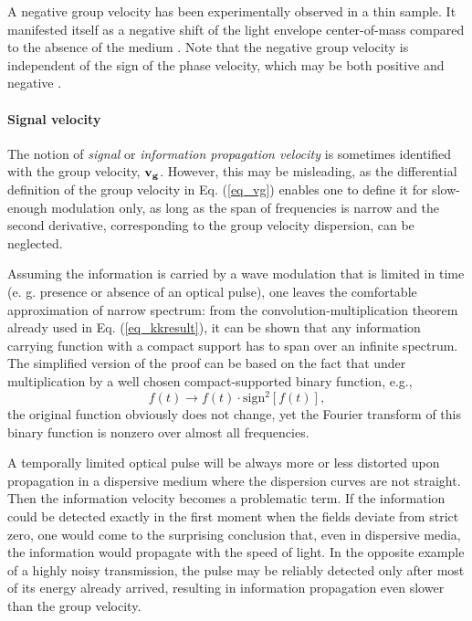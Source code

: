 A negative group velocity has been experimentally observed in a thin sample. It manifested itself as a negative shift of the light envelope center-of-mass compared to the absence of the medium \cite{dolling2006simultaneous}. Note that the negative group velocity is independent of the sign of the phase velocity, which may be both positive and negative \cite{mikki2009electromagnetic}.

\paragraph{Signal velocity}%
The notion of \textit{signal} or \textit{information propagation velocity} is sometimes %
identified with the group velocity, ${\mathbf{v_g}}$. However, this may be misleading, as the differential definition of the group velocity in Eq. (\ref{eq_vg}) enables one to define it for slow-enough modulation only, as long as  the span of frequencies is narrow and the second derivative, corresponding to the group velocity dispersion, can be neglected.

Assuming the information is carried by a wave modulation that is limited in time (e. g. presence or absence of an optical pulse), one leaves the comfortable approximation of narrow spectrum: from the convolution-multiplication theorem already used in Eq. (\ref{eq_kkresult}), it can be shown that any information carrying function with a compact support has to span over an infinite spectrum. The simplified version of the proof \cite{hill2013uncertainty} can be based on the fact that under multiplication by a well chosen compact-supported binary function, e.g., 
$$ f(t) \rightarrow f(t) \cdot \mathrm{sign}^2[f(t)], $$
the original function obviously does not change, yet the Fourier transform of this binary function is nonzero over almost all frequencies. 

A temporally limited optical pulse will be always more or less distorted upon propagation in a dispersive medium where the dispersion curves are not straight. Then the information velocity becomes a problematic term. If the information could be detected exactly in the first moment when the fields deviate from strict zero, one would come to the surprising conclusion that, even in dispersive media, the information would propagate with the speed of light. In the opposite example of a highly noisy transmission, the pulse may be reliably detected only after most of its energy already arrived, resulting in information propagation even slower than the group velocity. 


